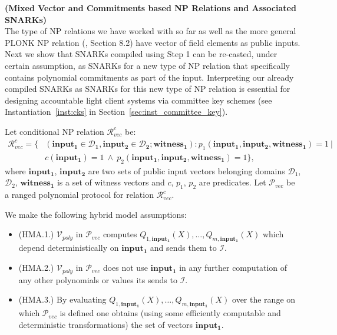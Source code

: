 \noindent \textbf{(Mixed Vector and Commitments based NP Relations and Associated SNARKs)} \\

\noindent The type of NP relations we have worked with so far as well as the more general PLONK NP relation 
(\cite{plonk}, Section 8.2) have vector of field elements as public inputs. Next we show that SNARKs 
compiled using Step 1 can be re-casted, under certain assumption, as SNARKs for a new type of NP relation 
that specifically contains polynomial commitments as part of the input. Interpreting 
our already compiled SNARKs as SNARKs for this new type of NP relation is essential for designing 
accountable light client systems via committee key schemes (see Instantiation~\ref{inst:cks} 
in Section~\ref{sec:inst_committee_key}).  

\noindent Let conditional NP relation $\mathcal{R}_{\mathit{vec}}^c$  be:
\begin{align*}
\mathcal{R}_{\mathit{vec}}^c = \{&(\mathbf{input_1} \in \mathbf{\mathcal{D}_1}, \mathbf{input_2} \in\mathbf{\mathcal{D}_2}; \mathbf{witness_1}): p_1(\mathbf{input_1}, \mathbf{input_2}, \mathbf{witness_1}) = 1 \ |  \\ 
& c(\mathbf{input_1}) = 1 \ \wedge \ p_2(\mathbf{input_1}, \mathbf{input_2}, \mathbf{witness_1}) = 1 \},
\end{align*}
\noindent where $\mathbf{input_1}$, $\mathbf{input_2}$ are two sets of public input vectors 
belonging domains  $\mathcal{D}_1$, $\mathcal{D}_2$, $\mathbf{witness_1}$ is a set of witness vectors and $c$, $p_1$, $p_2$ are predicates. 
Let $\mathscr{P}_{\mathit{vec}}$ be a ranged polynomial protocol for relation $\mathcal{R}_{\mathit{vec}}^c$. 

\noindent We make the following hybrid model assumptions:
\begin{itemize}
\item (HMA.1.) $\mathcal{V}_{poly}$ in $\mathscr{P}_{\mathit{vec}}$ computes 
$\mathit{Q_{1,\mathbf{input_1}}}(X), \ldots, \mathit{Q_{m, \mathbf{input_1}}}(X)$ which depend deterministically on $\mathbf{input_1}$ and sends them to $\mathcal{I}$. 
\item (HMA.2.) $\mathcal{V}_{poly}$ in $\mathscr{P}_{\mathit{vec}}$ does not use $\mathbf{input_1}$ in any further computation of 
any other polynomials or values its sends to $\mathcal{I}$.
\item (HMA.3.) By evaluating $\mathit{Q_{1,\mathbf{input_1}}}(X), \ldots, \mathit{Q_{m, \mathbf{input_1}}}(X)$ over the range on which 
$\mathscr{P}_{\mathit{vec}}$ is defined one obtains (using some efficiently computable and deterministic transformations) the set of vectors $\mathbf{input_1}$. 
\end{itemize} 

